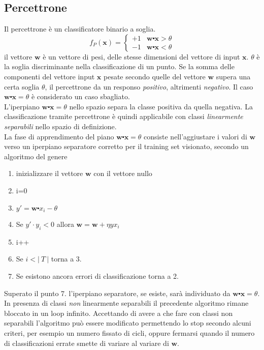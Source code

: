 \documentclass [10pt,a4paper,twoside,openright] {book}
\begin{document}
\subsection{Percettrone}
Il percettrone è un classificatore binario a soglia.
\[
f_P(\mathbf{x})=
\begin{cases}
+1 & \mathbf{w} \centerdot  \mathbf{x} > \theta \\
-1 & \mathbf{w} \centerdot \mathbf{x} < \theta
\end{cases}
\]
il vettore $\mathbf{w}$ è un vettore di pesi, delle stesse dimensioni del vettore di input $\mathbf{x}$. $\theta$ è la soglia discriminante nella classificazione di un punto. Se la somma delle componenti del vettore input $\mathbf{x}$ pesate secondo quelle del vettore $\mathbf{w}$ supera una certa soglia $\theta$, il percettrone da un responso \textit{positivo}, altrimenti \textit{negativo}. Il caso $\mathbf{w} \centerdot \mathbf{x} = \theta$ è considerato un caso sbagliato.\\
L'iperpiano $\mathbf{w} \centerdot \mathbf{x} = \theta$ nello spazio separa la classe positiva da quella negativa. La classificazione tramite percettrone è quindi applicabile con classi \textit{linearmente separabili} nello spazio di definizione.\\
La fase di apprendimento del piano $\mathbf{w} \centerdot \mathbf{x} = \theta$ consiste nell'aggiustare i valori di $\mathbf{w}$ verso un iperpiano separatore corretto per il training set visionato, secondo un algoritmo del genere
\begin{enumerate}
\item inizializzare il vettore $\mathbf{w}$ con il vettore nullo
\item i=0
\item $y' = \mathbf{w}  \centerdot x_i - \theta$
\item Se $y' \cdot y_i < 0$ allora $\mathbf{w} = \mathbf{w} + \eta y x_i$
\item i++
\item Se $i < | \: T \: |$ torna a 3.
\item Se esistono ancora errori di classificazione torna a 2.
\end{enumerate}
Superato il punto 7. l'iperpiano separatore, se esiste, sarà individuato da $\mathbf{w}  \centerdot \mathbf{x} = \theta$. In presenza di classi \textit{non} linearmente separabili il precedente algoritmo rimane bloccato in un loop infinito. Accettando di avere a che fare con classi non separabili l'algoritmo può essere modificato permettendo lo stop secondo alcuni criteri, per esempio un numero fissato di cicli, oppure fermarsi quando il numero di classificazioni errate smette di variare al variare di $\mathbf{w}$.\\
\end{document}
